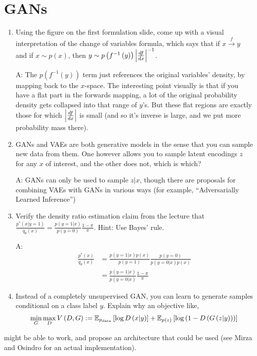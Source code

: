 \documentclass{article}
\begin{document}
\section{GANs}

\begin{enumerate}
\item Using the figure on the first formulation slide, come up with a visual
  interpretation of the change of variables formula, which says that if $x
  \xrightarrow{f} y$ and if $x \sim p\left(x\right)$, then $y \sim
  p\left(f^{-1}\left(y\right)\right)\left|\frac{df}{dx}\right|^{-1}$.

  A: The $p\left(f^{-1}\left(y\right)\right)$ term just references the original
  variables' density, by mapping back to the $x$-space. The interesting point
  visually is that if you have a flat part in the forwards mapping, a lot of the
  original probability density gets collapsed into that range of $y$'s. But
  these flat regions are exactly those for which $\left|\frac{df}{dx}\right|$ is
  small (and so it's inverse is large, and we put more probability mass there).

\item GANs and VAEs are both generative models in the sense that you can sample
  new data from them. One however allows you to sample latent encodings $z$ for
  any $x$ of interest, and the other does not, which is which?

  A: GANs can only be used to sample $z \vert x$, though there are proposals for
  combining VAEs with GANs in various ways (for example, ``Adversarially Learned
  Inference'')

\item Verify the density ratio estimation claim from the lecture that
  $\frac{p^{\ast}\left(x \vert y = 1\right)}{q_{\theta}\left(x\right)} =
  \frac{p\left(y = 1\vert x\right)}{p\left(y = 0\right)}\frac{1 - \pi}{\pi}$.
  Hint: Use Bayes' rule.

  A:
  \begin{align*}
     \frac{p^{\ast}\left(x\right)}{q_{\theta}\left(x\right)} &= \frac{p\left(y =
       1 \vert x\right)p\left(x\right)}{p\left(y = 1\right)} \frac{p\left(y =
       0\right)}{p\left(y = 0 \vert x\right)p\left(x\right)} \\
     &= \frac{p\left(y = 1 \vert x\right)}{p\left(y = 0 \vert x\right)} \frac{1 - \pi}{\pi}
  \end{align*}

\item Instead of a completely unsupervised GAN, you can learn to generate
  samples conditional on a class label $y$. Explain why an objective like,
  \begin{align*}
    \min_{G}\max_{D} V\left(D, G\right) := \mathbb{E}_{p_{\text{data}}}\left[{\log D\left(x \vert y\right)}\right] + \mathbb{E}_{p\left(z\right)}\left[{\log\left(1 - D\left(G\left(z \vert y\right)\right)\right)}\right]
  \end{align*}
\end{enumerate}
might be able to work, and propose an architecture that could be used (see Mirza
and Osindro for an actual implementation).
\end{document}
